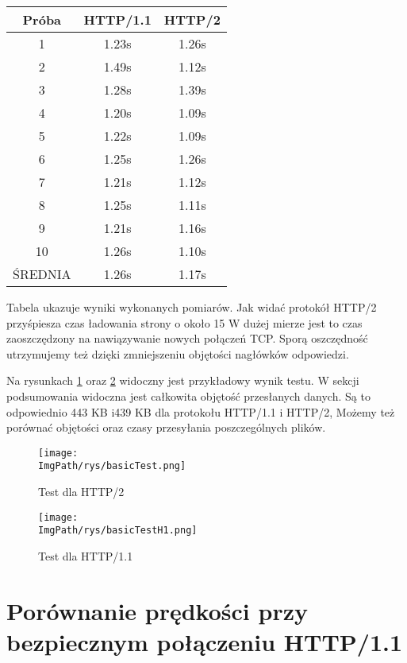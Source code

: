 \documentclass[a4paper,12pt,twoside,openany]{report}
\newcommand{\ImgPath}{.}
\begin{document}
\begin{tabular}{c|c|c}
Próba & HTTP/1.1 & HTTP/2 \\ \hline
1 & 1.23s & 1.26s\\
2 & 1.49s & 1.12s\\
3 & 1.28s & 1.39s\\
4 & 1.20s & 1.09s\\
5 & 1.22s & 1.09s\\
6 & 1.25s & 1.26s\\
7 & 1.21s & 1.12s\\
8 & 1.25s & 1.11s\\
9 & 1.21s & 1.16s\\
10 & 1.26s & 1.10s\\ \hline
ŚREDNIA & 1.26s & 1.17s\\
\end{tabular}

Tabela ukazuje wyniki wykonanych pomiarów.
Jak widać protokół HTTP/2 przyśpiesza czas ładowania strony o około 15%
W dużej mierze jest to czas zaoszczędzony na nawiązywanie nowych połączeń TCP.
Sporą oszczędność utrzymujemy też dzięki zmniejszeniu objętości nagłówków odpowiedzi.

Na rysunkach \ref{schematBasicTest} oraz \ref{schematBasicTestH1} widoczny jest przykładowy wynik testu.
W sekcji podsumowania widoczna jest całkowita objętość przesłanych danych. Są to odpowiednio 443 KB i439 KB dla protokołu HTTP/1.1 i HTTP/2,
Możemy też porównać objętości oraz czasy przesyłania poszczególnych plików.

\begin{figure}[!htbp]
	\begin{center}
\centering
\texttt{[image: \\ImgPath/rys/basicTest.png]}
\end{center}
	\caption{Test dla HTTP/2}
	\label{schematBasicTest}
\end{figure}

\begin{figure}[!htbp]
	\begin{center}
\centering
\texttt{[image: \\ImgPath/rys/basicTestH1.png]}
\end{center}
	\caption{Test dla HTTP/1.1}
	\label{schematBasicTestH1}
\end{figure}

\section{Porównanie prędkości przy bezpiecznym połączeniu HTTP/1.1}
\end{document}
